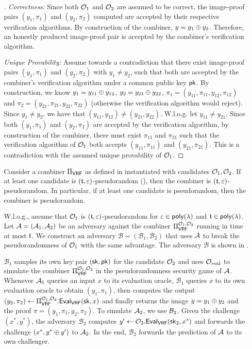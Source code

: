 \begin{proof}[]
	\textit{Correctness:} Since both $\mathcal{O}_1$ and $\mathcal{O}_2$ are assumed to be correct, the image-proof pairs $(y_1, \pi_1)$ and $(y_2, \pi_2)$
	computed are accepted by their respective verification algorithms. By construction of the combiner, $y = y_1 \oplus y_2$. Therefore, an honestly produced image-proof pair is accepted by the combiner's verification algorithm.

	\textit{Unique Provability:} 
	Assume towards a contradiction that there exist image-proof pairs $(y_1, \pi_1)$ and $(y_2, \pi_2)$ with $y_1 \neq y_2$, such that both are accepted by the combiner's verification algorithm under 
	a common public key $\textup{\textsf{pk}}$. By construction, we know $y_1 = y_{11} \oplus y_{12}$, $y_2 = y_{21} \oplus y_{22}$, $\pi_1 = (y_{11},\pi_{11}, y_{12},\pi_{12})$ and $\pi_2 = (y_{21}, \pi_{21}, y_{22}, \pi_{22})$ (otherwise the verification algorithm would reject).
	Since $y_1 \neq y_2$, we have that $(y_{11}, y_{12}) \neq (y_{21}, y_{22})$. W.l.o.g. let $y_{11} \neq y_{21}$. Since both $(y_1, \pi_1)$ and $(y_2, \pi_2)$
	are accepted by the verification algorithm, by construction of the combiner, there must exist $\pi_{11}$ and $\pi_{21}$ such that the verification algorithm of $\mathcal{O}_1$
	both accepts $(y_{11}, \pi_{11})$ and $(y_{21}, \pi_{21})$. This is a contradiction with the assumed unique provability of $\mathcal{O}_1$.
\end{proof}

\begin{claim}\label{claim:prf_vrf_comb}
	Consider a combiner $\BBComb{VRF}$ as defined in  instantiated with candidates $\mathcal{O}_1, \mathcal{O}_2$.
	If at least one candidate is $\errtime$-pseudorandom (), then the combiner is $\errtime$-pseudorandom.
	In particular, if at least one candidate is pseudorandom, then the combiner is pseudorandom.
\end{claim}

W.l.o.g., assume that $\mathcal{O}_1$ is $\errtime$-pseudorandom for $\err \in \poly$ and $\runtime \in \poly$.
Let $\mathcal{A} = (\mathcal{A}_1, \mathcal{A}_2)$ be an adversary against the combiner $\BBComb{VRF}[\O_1, \O_2]$ running in time at most 
$\runtime$. We construct an adversary $\mathcal B = (\mathcal B_1, \mathcal B_2)$ that uses $\mathcal{A}$ to break the pseudorandomness of 
$\mathcal{O}_1$ with the same advantage. The adversary $\mathcal B$ is shown in .

$\mathcal B_1$ samples its own key pair $(\textup{\textsf{sk}}, \textup{\textsf{pk}})$ for the candidate $\mathcal{O}_2$ and uses $\mathcal{O}_{\text{eval}}$ to simulate the combiner $\BBComb{VRF}[\O_1, \O_2]$
in the pseudorandomness security game of $\mathcal{A}$. Whenever $\mathcal{A}_1$ queries an input $x$ to its evaluation oracle, 
$\mathcal B_1$ queries $x$ to its own evaluation oracle to obtain $(y_1,\pi_1)$, then computes the output $(y_2,\pi_2) \gets \BBComb{VRF}[\O_1,\O_2].\alg{Eval}{VRF}(\sk, x)$
and finally returns the image $y = y_1 \oplus y_2$ and the proof $\pi = (y_1,\pi_1,y_2,\pi_2)$. To simulate $\mathcal{A}_2$, we use $\mathcal{B}_2$.
Given the challenge $(x^*, y^*)$, the adversary $\mathcal B_2$ computes $y' \gets \O_2.\alg{Eval}{VRF}(\sk_2, x^*)$ and
forwards the challenge $(x^*, y^* \oplus y')$ to $\mathcal{A}_2$. In the end, $\mathcal B_2$ forwards the prediction of $\mathcal{A}$ to its own challenger.


